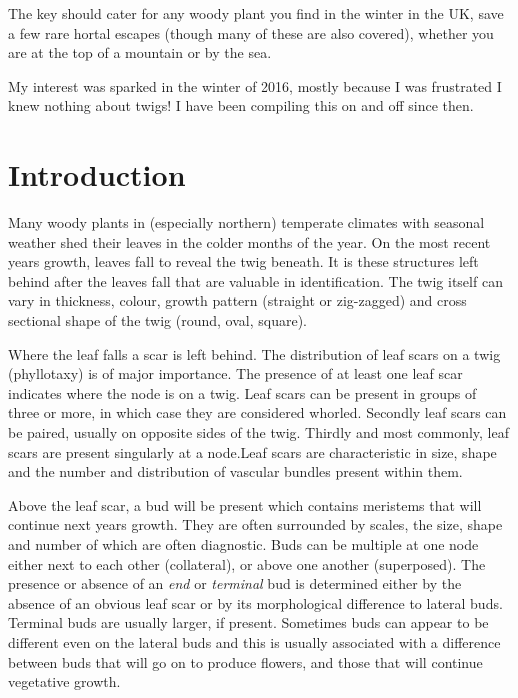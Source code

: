 \documentclass[openany]{book}
\begin{document}
The key should cater for any woody plant you find in the winter in the UK, save a few rare hortal escapes (though many of these are also covered), whether you are at the top of a mountain or by the sea.

My interest was sparked in the winter of 2016, mostly because I was frustrated I knew nothing about twigs! I have been compiling this on and off since then.

\hypertarget{introduction}{%
\chapter*{Introduction}\label{introduction}}

Many woody plants in (especially northern) temperate climates with seasonal weather shed their leaves in the colder months of the year. On the most recent years growth, leaves fall to reveal the twig beneath. It is these structures left behind after the leaves fall that are valuable in identification. The twig itself can vary in thickness, colour, growth pattern (straight or zig-zagged) and cross sectional shape of the twig (round, oval, square).

Where the leaf falls a scar is left behind. The distribution of leaf scars on a twig (phyllotaxy) is of major importance. The presence of at least one leaf scar indicates where the node is on a twig. Leaf scars can be present in groups of three or more, in which case they are considered whorled. Secondly leaf scars can be paired, usually on opposite sides of the twig. Thirdly and most commonly, leaf scars are present singularly at a node.Leaf scars are characteristic in size, shape and the number and distribution of vascular bundles present within them.

Above the leaf scar, a bud will be present which contains meristems that will continue next years growth. They are often surrounded by scales, the size, shape and number of which are often diagnostic. Buds can be multiple at one node either next to each other (collateral), or above one another (superposed). The presence or absence of an \emph{end} or \emph{terminal} bud is determined either by the absence of an obvious leaf scar or by its morphological difference to lateral buds. Terminal buds are usually larger, if present. Sometimes buds can appear to be different even on the lateral buds and this is usually associated with a difference between buds that will go on to produce flowers, and those that will continue vegetative growth.
\end{document}
